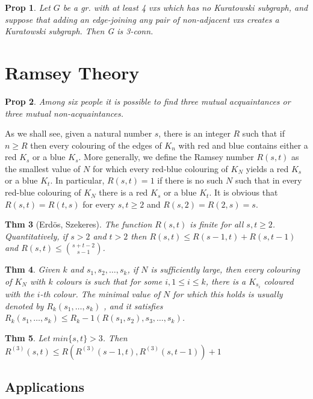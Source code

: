 \documentclass[11pt, fleqn, a4paper, landscape]{article}
\theoremstyle{plain} %
\newtheorem{thm}{Thm}
\newtheorem{pro}[thm]{Prop}
\theoremstyle{remark} %
\theoremstyle{definition} %
\begin{document}
\begin{multicols}{5}
\begin{pro}
Let $G$ be a gr. with at least 4 vxs which has no Kuratowski subgraph, and suppose that adding an edge-joining any pair of non-adjacent vxs creates a Kuratowski subgraph.
Then G is 3-conn.
\end{pro}

\section{Ramsey Theory}

\begin{pro}
Among six people it is possible to find three mutual acquaintances or three mutual non-acquaintances.
\end{pro}

As we shall see, given a natural number $s$, there is an integer $R$ such that if $n \ge R$ then every colouring of the edges of $K_n$ with red and blue contains either a red $K_s$ or a blue $K_s$. More generally, we define the Ramsey number $R(s, t)$ as the smallest value of $N$ for which every red-blue colouring of $K_N$ yields a red $K_s$ or a blue $K_t$. In particular, $R(s, t) = 1$ if there is no such $N$ such that in every red-blue
colouring of $K_N$ there is a red $K_s$ or a blue $K_t$. It is obvious that
$ R(s, t) = R(t, s)$ for every $s, t \ge 2$ and $R(s, 2) = R(2, s) = s$. 

\begin{thm}[Erdös, Szekeres]
The function $R(s, t)$ is finite for all $s, t \ge 2$. Quantitatively, if $s > 2 $ and $t > 2$ then $R(s, t)\le R(s - 1, t) + R(s, t - 1)$ and $R(s, t) \le \binom{s+t-2}{s-1}$.
\end{thm}

\begin{thm}
Given $k$ and $s_1, s_2, \dots , s_k$, if $N$ is sufficiently large, then every colouring of $K_N$ with $k$ colours is such that for some $i, 1 \le i \le k$, there is a $K_{s_i}$ coloured with the $i$-th colour. The
minimal value of $N$ for which this holds is usually denoted by $R_k(s_1, \dots , s_k)$ , and it satisfies $R_k(s_1, \dots , s_k)\le R_k-1(R(s_1, s_2), s_3, \dots , s_k)$.
\end{thm}

\begin{thm}
Let $min\{s, t\} > 3$. Then
$R^{(3)}(s, t) \le R(R^{(3)}(s - 1, t),R^{(3)}(s, t - 1)) + 1$
\end{thm}

\subsection{Applications}


\end{multicols}
\end{document}
